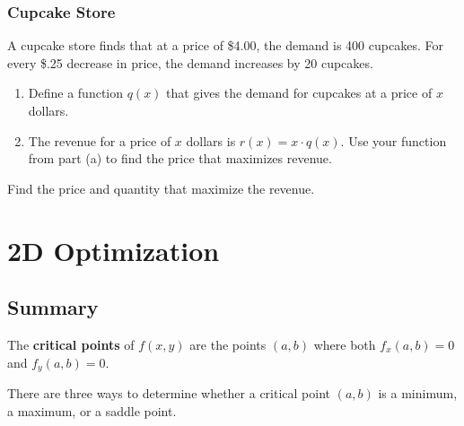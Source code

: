 \documentclass[
]{book}
\providecommand{\tightlist}{%
  \setlength{\itemsep}{0pt}\setlength{\parskip}{0pt}}
\begin{document}
\hypertarget{cupcake-store}{%
\subsection{Cupcake Store}\label{cupcake-store}}

A cupcake store finds that at a price of \$4.00, the demand is 400 cupcakes. For every \$.25 decrease in price, the demand increases by 20 cupcakes.

\begin{enumerate}
\def\labelenumi{\arabic{enumi}.}
\tightlist
\item
  Define a function \(q(x)\) that gives the demand for cupcakes at a price of \(x\) dollars.
\item
  The revenue for a price of \(x\) dollars is \(r(x) = x \cdot q(x)\). Use your function from part (a) to find the price that maximizes revenue.
\end{enumerate}

Find the price and quantity that maximize the revenue.

\hypertarget{d-optimization-1}{%
\chapter{2D Optimization}\label{d-optimization-1}}

\hypertarget{summary}{%
\section{Summary}\label{summary}}

The \textbf{critical points} of \(f(x,y)\) are the points \((a,b)\) where both \(f_x(a,b)=0\) and \(f_y(a,b)=0\).

There are three ways to determine whether a critical point \((a,b)\) is a minimum, a maximum, or a saddle point.
\end{document}
